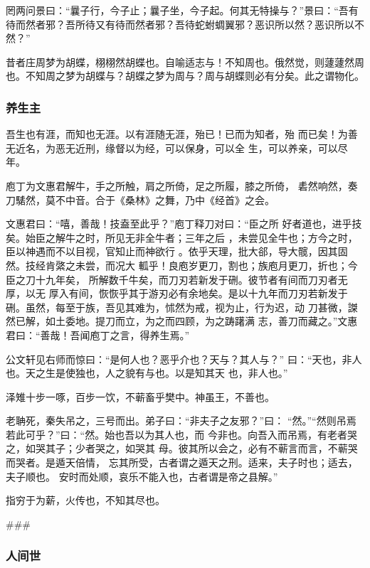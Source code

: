 \documentclass[]{article}
\begin{document}
罔两问景曰：``曩子行，今子止；曩子坐，今子起。何其无特操与？''景曰：``吾有待而然者邪？吾所待又有待而然者邪？吾待蛇蚹蜩翼邪？恶识所以然？恶识所以不然？''

昔者庄周梦为胡蝶，栩栩然胡蝶也。自喻适志与！不知周也。俄然觉，则蘧蘧然周也。不知周之梦为胡蝶与？胡蝶之梦为周与？周与胡蝶则必有分矣。此之谓物化。

\hypertarget{header-n1989}{%
\subsubsection{养生主}\label{header-n1989}}

吾生也有涯，而知也无涯。以有涯随无涯，殆已！已而为知者，殆
而已矣！为善无近名，为恶无近刑，缘督以为经，可以保身，可以全
生，可以养亲，可以尽年。

庖丁为文惠君解牛，手之所触，肩之所倚，足之所履，膝之所倚，
砉然响然，奏刀騞然，莫不中音。合于《桑林》之舞，乃中《经首》之会。

文惠君曰：``嘻，善哉！技盍至此乎？''庖丁释刀对曰：``臣之所
好者道也，进乎技矣。始臣之解牛之时，所见无非全牛者；三年之后
，未尝见全牛也；方今之时，臣以神遇而不以目视，官知止而神欲行
。依乎天理，批大郤，导大髋，因其固然。技经肯綮之未尝，而况大
軱乎！良庖岁更刀，割也；族庖月更刀，折也；今臣之刀十九年矣，
所解数千牛矣，而刀刃若新发于硎。彼节者有间而刀刃者无厚，以无
厚入有间，恢恢乎其于游刃必有余地矣。是以十九年而刀刃若新发于
硎。虽然，每至于族，吾见其难为，怵然为戒，视为止，行为迟，动
刀甚微，謋然已解，如土委地。提刀而立，为之而四顾，为之踌躇满
志，善刀而藏之。''文惠君曰：``善哉！吾闻庖丁之言，得养生焉。''

公文轩见右师而惊曰：``是何人也？恶乎介也？天与？其人与？''
曰：``天也，非人也。天之生是使独也，人之貌有与也。以是知其天
也，非人也。''

泽雉十步一啄，百步一饮，不蕲畜乎樊中。神虽王，不善也。

老聃死，秦失吊之，三号而出。弟子曰：``非夫子之友邪？''曰：
``然。''``然则吊焉若此可乎？''曰：``然。始也吾以为其人也，而
今非也。向吾入而吊焉，有老者哭之，如哭其子；少者哭之，如哭其
母。彼其所以会之，必有不蕲言而言，不蕲哭而哭者。是遁天倍情，
忘其所受，古者谓之遁天之刑。适来，夫子时也；适去，夫子顺也。
安时而处顺，哀乐不能入也，古者谓是帝之县解。''

指穷于为薪，火传也，不知其尽也。

\#\#\#

\hypertarget{header-n2000}{%
\subsubsection{人间世}\label{header-n2000}}
\end{document}
